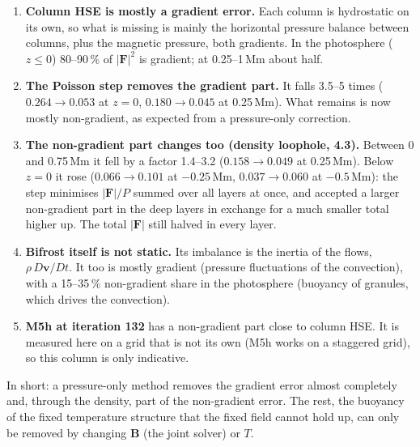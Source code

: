\documentclass[10pt]{extarticle}
\newcommand{\B}{\mathbf B}\newcommand{\J}{\mathbf J}\newcommand{\F}{\mathbf F}\newcommand{\zh}{\hat{\mathbf z}}
\begin{document}
\begin{enumerate}
\item \textbf{Column HSE is mostly a gradient error.} Each column is hydrostatic on its own, so what is missing is mainly
the horizontal pressure balance between columns, plus the magnetic pressure, both gradients. In the photosphere
($z\le0$) 80--90\,\% of $|\F|^2$ is gradient; at 0.25--1\,Mm about half.
\item \textbf{The Poisson step removes the gradient part.} It falls 3.5--5 times ($0.264\to0.053$ at $z=0$, $0.180\to0.045$ at
0.25\,Mm). What remains is now mostly non-gradient, as expected from a pressure-only correction.
\item \textbf{The non-gradient part changes too (density loophole, 4.3).} Between 0 and 0.75\,Mm it fell by a factor 1.4--3.2
($0.158\to0.049$ at 0.25\,Mm). Below $z=0$ it rose ($0.066\to0.101$ at $-0.25$\,Mm, $0.037\to0.060$ at $-0.5$\,Mm): the
step minimises $|\F|/P$ summed over all layers at once, and accepted a larger non-gradient part in the deep layers in
exchange for a much smaller total higher up. The total $|\F|$ still halved in every layer.
\item \textbf{Bifrost itself is not static.} Its imbalance is the inertia of the flows, $\rho\,D\mathbf v/Dt$. It too is
mostly gradient (pressure fluctuations of the convection), with a 15--35\,\% non-gradient share in the photosphere (buoyancy
of granules, which drives the convection).
\item \textbf{M5h at iteration 132} has a non-gradient part close to column HSE. It is measured here on a grid
that is not its own (M5h works on a staggered grid), so this column is only indicative.
\end{enumerate}
In short: a pressure-only method removes the gradient error almost completely and, through the density, part of the
non-gradient error. The rest, the buoyancy of the fixed temperature structure that the fixed field cannot hold up, can
only be removed by changing $\B$ (the joint solver) or $T$.
\end{document}
